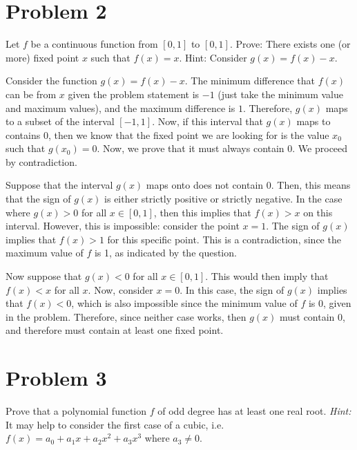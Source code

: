 \documentclass[10pt]{article}
\begin{document}
	\pagebreak

	\section*{Problem 2}
	Let $f$ be a continuous function from $[0, 1]$ to $[0, 1]$. Prove: There exists one (or more) fixed point
	$x$ such that $f(x) = x$. Hint: Consider $g(x) = f(x) - x$.

	\begin{solution}
		Consider the function $g(x) = f(x) - x$. The minimum difference that $f(x)$ can be from $x$ given the
		problem statement is $-1$ (just take the minimum value and maximum values), and the maximum difference
		is $1$. Therefore, $g(x)$ maps to a subset of the
		interval $[-1, 1]$. Now, if this interval that $g(x)$ maps to contains 0, then we know that the fixed
		point we are looking for is the value $x_0$ such that $g(x_0) = 0$. Now, we prove that it must always
		contain 0. We proceed by contradiction. 

		Suppose that the interval $g(x)$ maps onto does not contain $0$. Then, this means that the sign of $g(x)$
		is either strictly positive or strictly negative. In the case where $g(x) > 0$ for all $x \in [0, 1]$, 
		then this implies that $f(x) > x$ on this interval. However, this is impossible: consider the point $x =
		1$. The sign of $g(x)$ implies that $f(x) > 1$ for this specific point. This is a contradiction, since 
		the maximum value of $f$ is 1, as indicated by the question. 

		Now suppose that $g(x) < 0$ for all $x \in [0, 1]$. This would then imply that $f(x) < x$ for all $x$. 
		Now, consider $x = 0$. In this case, the sign of $g(x)$ implies that $f(x) < 0$, which is also impossible
		since the minimum value of $f$ is 0, given in the problem. Therefore, since neither case works, then 
		$g(x)$ must contain 0, and therefore must contain at least one fixed point. 
	\end{solution}

	\pagebreak
	\section*{Problem 3}
	Prove that a polynomial function $f$ of odd degree has at least one real root. \textit{Hint:} It may help 
	to consider the first case of a cubic, i.e. $f(x) = a_0 + a_1x + a_2x^2 + a_3x^3$ where $a_3 \neq 0$. 
\end{document}
